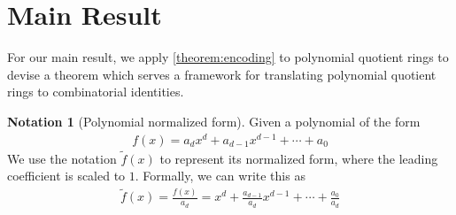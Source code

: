 \documentclass[11pt,reqno]{article}
\theoremstyle{plain}
\theoremstyle{definition}
\newtheorem{notation}{Notation}
\begin{document}
\section{Main Result} \label{section:results}
For our main result, we apply \cref{theorem:encoding} to polynomial quotient rings to devise a theorem which serves a framework for translating polynomial quotient rings to combinatorial identities.

\begin{notation}[Polynomial normalized form]
Given a polynomial of the form
\begin{align*}
f(x) = a_d x^d + a_{d-1} x^{d-1} + \cdots + a_0
\end{align*}
We use the notation $\tilde{f}(x)$ to represent its normalized form, where the leading coefficient is scaled to $1$. Formally, we can write this as
\begin{align*}
    \tilde{f}(x) = \frac{f(x)}{a_d} = x^d + \frac{a_{d-1}}{a_d} x^{d-1} + \cdots + \frac{a_0}{a_d}
\end{align*}
\end{notation}
\end{document}
